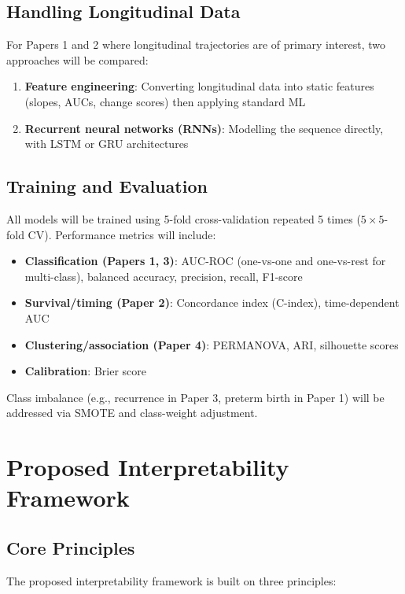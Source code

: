 \documentclass[12pt,a4paper]{report}
\begin{document}
\subsection{Handling Longitudinal Data}

For Papers 1 and 2 where longitudinal trajectories are of primary interest, two approaches will be compared:
\begin{enumerate}
    \item \textbf{Feature engineering}: Converting longitudinal data into static features (slopes, AUCs, change scores) then applying standard ML
    \item \textbf{Recurrent neural networks (RNNs)}: Modelling the sequence directly, with LSTM or GRU architectures \cite{esteva2019}
\end{enumerate}

\subsection{Training and Evaluation}

All models will be trained using 5-fold cross-validation repeated 5 times ($5 \times 5$-fold CV). Performance metrics will include:
\begin{itemize}
    \item \textbf{Classification (Papers 1, 3)}: AUC-ROC (one-vs-one and one-vs-rest for multi-class), balanced accuracy, precision, recall, F1-score
    \item \textbf{Survival/timing (Paper 2)}: Concordance index (C-index), time-dependent AUC
    \item \textbf{Clustering/association (Paper 4)}: PERMANOVA, ARI, silhouette scores
    \item \textbf{Calibration}: Brier score
\end{itemize}

Class imbalance (e.g., recurrence in Paper 3, preterm birth in Paper 1) will be addressed via SMOTE \cite{chawla2002} and class-weight adjustment.

\section{Proposed Interpretability Framework}

\subsection{Core Principles}

The proposed interpretability framework is built on three principles:
\end{document}
